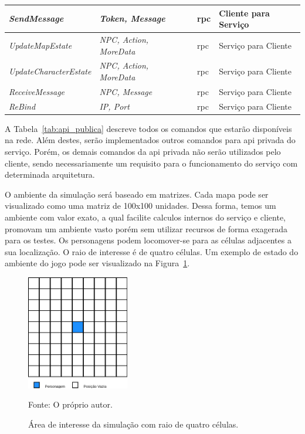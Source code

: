 \begin{table}[htb!]
\begin{adjustbox}{max width=\textwidth}
\begin{tabular}{|l|l|l|l|l|}
\textit{SendMessage}           & \textit{Token, Message}        &           & \ac{rpc}           & Cliente para Serviço \\ \hline
\textit{UpdateMapEstate}       & \textit{NPC, Action, MoreData} &           & \ac{rpc}           & Serviço para Cliente \\ \hline
\textit{UpdateCharacterEstate} & \textit{NPC, Action, MoreData} &           & \ac{rpc}           & Serviço para Cliente \\ \hline
\textit{ReceiveMessage}        & \textit{NPC, Message}          &           & \ac{rpc}           & Serviço para Cliente \\ \hline
\textit{ReBind}                & \textit{IP, Port}              &           & \ac{rpc}           & Serviço para Cliente \\ \hline
\end{tabular}
\end{adjustbox}
\end{table}

A Tabela~\ref{tab:api_publica} descreve todos os comandos que estarão disponíveis na rede.
%
Além destes, serão implementados outros comandos para \ac{api} privada do serviço.
%
Porém, os demais comandos da \ac{api} privada não serão utilizados pelo cliente, sendo necessariamente um requisito para o funcionamento do serviço com determinada arquitetura.


O ambiente da simulação será baseado em matrizes.
%
Cada mapa pode ser visualizado como uma matriz de 100x100 unidades.
%
Dessa forma, temos um ambiente com valor exato, a qual facilite calculos internos do serviço e cliente, promovam um ambiente vasto porém sem utilizar recursos de forma exagerada para os testes.
%
Os personagens podem locomover-se para as células adjacentes a sua localização.
%
O raio de interesse é de quatro células.
%
Um exemplo de estado do ambiente do jogo pode ser visualizado na Figura~\ref{fig:roi}.

\begin{figure}[htb!]
  \caption{Área de interesse da simulação com raio de quatro células.}
  \label{fig:roi}
  \includegraphics[height=5.0cm]{img/cap3/roi.png}
  \centering

  Fonte: O próprio autor.
\end{figure}

